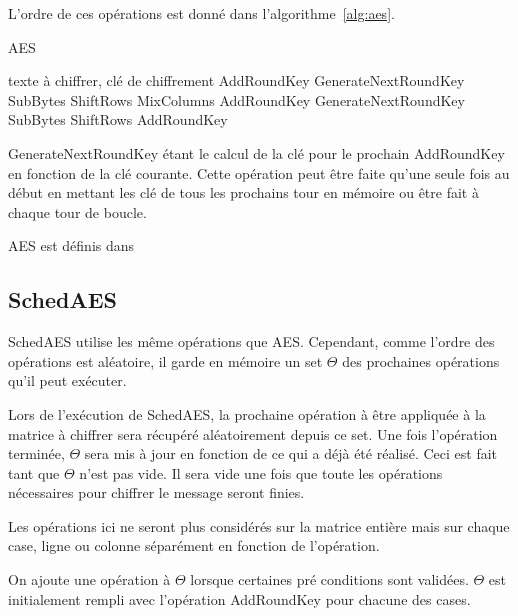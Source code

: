 \documentclass[letterpaper]{article}
\begin{document}
L'ordre de ces opérations est donné dans l'algorithme~\ref{alg:aes}.
\begin{algorithm}
    \caption{AES}
    \label{alg:aes}
    \begin{algorithmic}[1]
        \REQUIRE texte à chiffrer, clé de chiffrement
        \STATE AddRoundKey
        \STATE GenerateNextRoundKey
            \STATE SubBytes
            \STATE ShiftRows
            \STATE MixColumns
            \STATE AddRoundKey
            \STATE GenerateNextRoundKey
        \ENDFOR
        \STATE SubBytes
        \STATE ShiftRows
        \STATE AddRoundKey
    \end{algorithmic}
\end{algorithm}

GenerateNextRoundKey étant le calcul de la clé pour le prochain AddRoundKey en fonction de la clé courante.
Cette opération peut être faite qu'une seule fois au début en mettant les clé de tous les prochains tour en mémoire ou être fait à chaque tour de boucle.

AES est définis dans\cite{fips197}

\subsection{SchedAES}
SchedAES utilise les même opérations que AES. Cependant, comme l'ordre des opérations est aléatoire, il garde en mémoire un set $\Theta$ des prochaines opérations qu'il peut exécuter.

Lors de l'exécution de SchedAES, la prochaine opération à être appliquée à la matrice à chiffrer sera récupéré aléatoirement depuis ce set.
Une fois l'opération terminée, $\Theta$ sera mis à jour en fonction de ce qui a déjà été réalisé.
Ceci est fait tant que $\Theta$ n'est pas vide.
Il sera vide une fois que toute les opérations nécessaires pour chiffrer le message seront finies.

Les opérations ici ne seront plus considérés sur la matrice entière mais sur chaque case, ligne ou colonne séparément en fonction de l'opération.

On ajoute une opération à $\Theta$ lorsque certaines pré conditions sont validées.
$\Theta$ est initialement rempli avec l'opération AddRoundKey pour chacune des cases.
\end{document}
